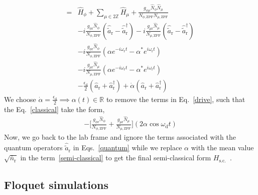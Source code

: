 \documentclass[%
reprint,
superscriptaddress,
 amsmath,amssymb,
 aps,
 prx,
longbibliography,
floatfix,
]{revtex4-2}
\begin{document}
\begin{align}
   =&\hat H_\phi+\sum_{\mu\in 2\mathbb{Z}}\hat H_\mu+\frac{g_{\phi\mu}\hat N_\phi\hat N_\mu}{N_{\phi,\textrm{ZPF}}N_{\mu,\textrm{ZPF}}}\label{bare}\\ 
   &-i\frac{g_{\phi\textrm{r}}\hat N_\phi}{N_{\phi,\textrm{ZPF}}}(\hat {\tilde{a}}_\textrm{r}-\hat {\tilde{a}}_\textrm{r}^\dagger)-i\frac{g_{\mu\textrm{r}}\hat N_\mu}{N_{\mu,\textrm{ZPF}}}(\hat {\tilde{a}}_\textrm{r}-\hat {\tilde{a}}_\textrm{r}^\dagger)\label{quantum}\\
   &-i\frac{g_{\phi\textrm{r}}\hat N_\phi}{N_{\phi,\textrm{ZPF}}}(\alpha e^{-i\omega_\textrm{r} t}-\alpha^* e^{i\omega_\textrm{r} t})\\&-i\frac{g_{\mu\textrm{r}}\hat N_\mu}{N_{\mu,\textrm{ZPF}}}(\alpha e^{-i\omega_\textrm{r} t}-\alpha^* e^{i\omega_\textrm{r} t})\label{classical}\\
   &-\frac{\epsilon_\textrm{d}}{2}(\hat a_\textrm{r}+\hat a_\textrm{r}^\dagger)+\dot{\alpha}(\hat a_\textrm{r}+\hat a_\textrm{r}^\dagger)\label{drive}
\end{align}
We choose $\dot{\alpha}=\frac{\epsilon_\textrm{d}}{2}\implies\alpha(t)\in\mathbb{R}$ to remove the terms in Eq.~\ref{drive}, such that the Eq.~\ref{classical} take the form,
\begin{align}
    -\Big[\frac{g_{\phi\textrm{r}}\hat N_\phi}{N_{\phi,\textrm{ZPF}}}+\frac{g_{\mu\textrm{r}}\hat N_\mu}{N_{\mu,\textrm{ZPF}}}\Big](2\alpha\cos{\omega_\textrm{d} t})\label{semi-classical}
\end{align}
Now, we go back to the lab frame and ignore the terms associated with the quantum operators $\hat{\tilde{a}}_\textrm{r}$ in Eqs.~\ref{quantum} while we replace $\alpha$ with the mean value $\sqrt{\bar n_\textrm{r}}$ in the term~\ref{semi-classical} to get the final semi-classical form $H_\textrm{s.c.}$~\cite{cohen2023reminiscence}.

\subsection{Floquet simulations}
\end{document}
